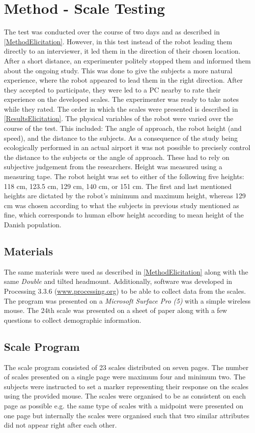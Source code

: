 \section{Method - Scale Testing}
\label{Method2}
The test was conducted over the course of two days and as described in \autoref{MethodElicitation}. However, in this test instead of the robot leading them directly to an interviewer, it led them in the direction of their chosen location. After a short distance, an experimenter politely stopped them and informed them about the ongoing study. This was done to give the subjects a more natural experience, where the robot appeared to lead them in the right direction. After they accepted to participate, they were led to a PC nearby to rate their experience on the developed scales. The experimenter was ready to take notes while they rated. The order in which the scales were presented is described in \autoref{ResultsElicitation}. The physical variables of the robot were varied over the course of the test. This included: The angle of approach, the robot height (and speed), and the distance to the subjects. As a consequence of the study being ecologically performed in an actual airport it was not possible to precisely control the distance to the subjects or the angle of approach. These had to rely on subjective judgement from the researchers. Height was measured using a measuring tape. The robot height was set to either of the following five heights: 118 cm, 123.5 cm, 129 cm, 140 cm, or 151 cm. The first and last mentioned heights are dictated by the robot's minimum and maximum height, whereas 129 cm was chosen according to what the subjects in previous study mentioned as fine, which corresponds to human elbow height according to mean height of the Danish population. 

\subsection{Materials}
The same materials were used as described in \autoref{MethodElicitation} along with the same \textit{Double} and tilted headmount. Additionally, software was developed in Processing 3.3.6 (\url{www.processing.org}) to be able to collect data from the scales. The program was presented on a \textit{Microsoft Surface Pro (5)} with a simple wireless mouse. The 24th scale was presented on a sheet of paper along with a few questions to collect demographic information.

\subsection{Scale Program}
The scale program consisted of 23 scales distributed on seven pages. The number of scales presented on a single page were maximum four and minimum two. The subjects were instructed to set a marker representing their response on the scales using the provided mouse. The scales were organised to be as consistent on each page as possible e.g. the same type of scales with a midpoint were presented on one page but internally the scales were organised such that two similar attributes did not appear right after each other.


